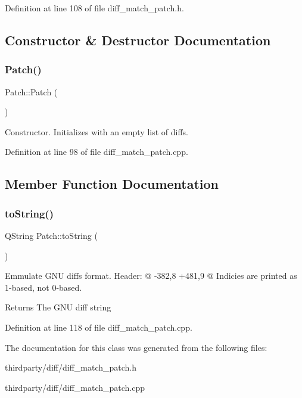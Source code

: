 Definition at line 108 of file diff\+\_\+match\+\_\+patch.\+h.



\subsection{Constructor \& Destructor Documentation}
\mbox{\label{class_patch_a65fdd4bb128b8f50c1b9dcc008f20360}} 
\subsubsection{\texorpdfstring{Patch()}{Patch()}}
{\footnotesize\ttfamily Patch\+::\+Patch (\begin{DoxyParamCaption}{ }\end{DoxyParamCaption})}

Constructor. Initializes with an empty list of diffs. 

Definition at line 98 of file diff\+\_\+match\+\_\+patch.\+cpp.



\subsection{Member Function Documentation}
\mbox{\label{class_patch_a53799d5296a89879d88f76c8f10602e7}} 
\subsubsection{\texorpdfstring{to\+String()}{toString()}}
{\footnotesize\ttfamily Q\+String Patch\+::to\+String (\begin{DoxyParamCaption}{ }\end{DoxyParamCaption})}

Emmulate G\+NU diff\textquotesingle{}s format. Header\+: @ -\/382,8 +481,9 @ Indicies are printed as 1-\/based, not 0-\/based. \begin{DoxyReturn}{Returns}
The G\+NU diff string 
\end{DoxyReturn}


Definition at line 118 of file diff\+\_\+match\+\_\+patch.\+cpp.



The documentation for this class was generated from the following files\+:\begin{DoxyCompactItemize}
\item 
thirdparty/diff/diff\+\_\+match\+\_\+patch.\+h\item 
thirdparty/diff/diff\+\_\+match\+\_\+patch.\+cpp\end{DoxyCompactItemize}
